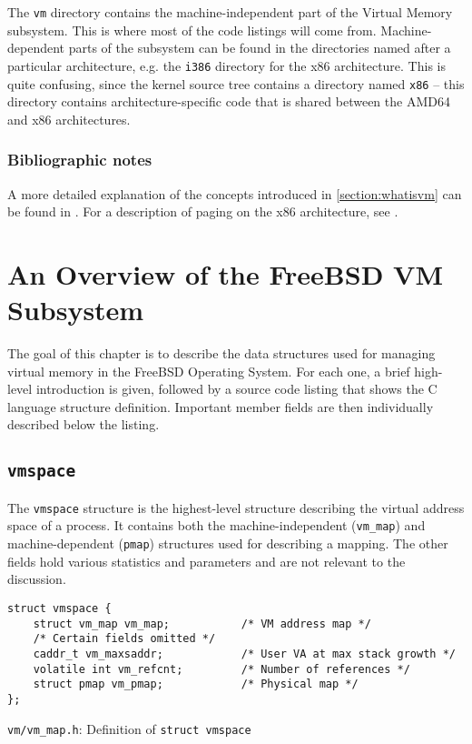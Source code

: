 \documentclass[shortabstract, english]{iithesis}
\begin{document}
The \texttt{vm} directory contains the machine-independent part of the Virtual
Memory subsystem. This is where most of the code listings will come from.
Machine-dependent parts of the subsystem can be found in the directories named
after a particular architecture, e.g. the \texttt{i386} directory for the x86
architecture. This is quite confusing, since the kernel source tree contains a
directory named \texttt{x86} -- this directory contains architecture-specific
code that is shared between the AMD64 and x86 architectures.

\subsection{Bibliographic notes}
A more detailed explanation of the concepts introduced in \ref{section:whatisvm}
can be found in \cite[Section~3.3]{bib:tanenbaum}. For a description of paging
on the x86 architecture, see \cite[Chapter~4]{bib:intel}.

\chapter{An Overview of the FreeBSD VM Subsystem}

The goal of this chapter is to describe the data structures used for managing
virtual memory in the FreeBSD Operating System. For each one, a brief high-level
introduction is given, followed by a source code listing that shows the C
language structure definition. Important member fields are then individually
described below the listing.

\section{\texttt{vmspace}}

The \texttt{vmspace} structure is the highest-level structure describing the
virtual address space of a process. It contains both the machine-independent
(\texttt{vm_map}) and machine-dependent (\texttt{pmap}) structures used for
describing a mapping. The other fields hold various statistics and parameters
and are not relevant to the discussion.

\begin{listing}[H]
\begin{verbatim}
struct vmspace {
    struct vm_map vm_map;           /* VM address map */
    /* Certain fields omitted */
    caddr_t vm_maxsaddr;            /* User VA at max stack growth */
    volatile int vm_refcnt;         /* Number of references */
    struct pmap vm_pmap;            /* Physical map */
};
\end{verbatim}
\caption{\texttt{vm/vm\_map.h}: Definition of \texttt{struct vmspace}}
\end{listing}
\end{document}

